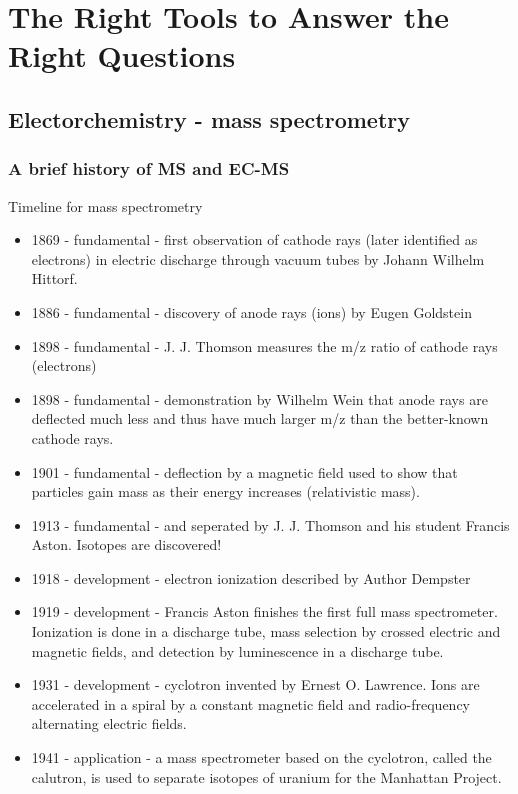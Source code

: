 

\chapter{The Right Tools to Answer the Right Questions}

\section{Electorchemistry - mass spectrometry}
\subsection{A brief history of MS and EC-MS}
Timeline for mass spectrometry


\begin{itemize}
	\item 1869 - fundamental - first observation of cathode rays (later identified as electrons) in electric discharge through vacuum tubes by Johann Wilhelm Hittorf.
	\item 1886 - fundamental - discovery of anode rays (ions) by Eugen Goldstein
	\item 1898 - fundamental - J. J. Thomson measures the m/z ratio of cathode rays (electrons)
	\item 1898 - fundamental - demonstration by Wilhelm Wein that anode rays are deflected much less and thus have much larger m/z than the better-known cathode rays.
	\item 1901 - fundamental - deflection by a magnetic field used to show that particles gain mass as their energy increases (relativistic mass).
	\item 1913 - fundamental -  and  seperated by J. J. Thomson and his student Francis Aston. Isotopes are discovered!
	\item 1918 - development - electron ionization described by Author Dempster
	\item 1919 - development - Francis Aston finishes the first full mass spectrometer. Ionization is done in a discharge tube, mass selection by crossed electric and magnetic fields, and detection by luminescence in a discharge tube.
	\item 1931 - development - cyclotron invented by Ernest O. Lawrence. Ions are accelerated in a spiral by a constant magnetic field and radio-frequency alternating electric fields.
	\item 1941 - application - a mass spectrometer based on the cyclotron, called the calutron, is used to separate isotopes of uranium for the Manhattan Project.

\end{itemize}

